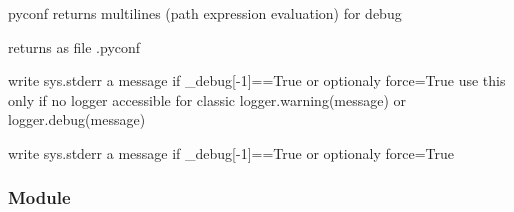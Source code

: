 \documentclass[a4paper,10pt,english]{sphinxmanual}
\begin{document}

\begin{fulllineitems}
\label{\detokenize{commands/apidoc/src:src.debug.saveConfigDbg}}
pyconf returns multilines (path expression evaluation) for debug

\end{fulllineitems}


\begin{fulllineitems}
\label{\detokenize{commands/apidoc/src:src.debug.saveConfigStd}}
returns as file .pyconf

\end{fulllineitems}


\begin{fulllineitems}
\label{\detokenize{commands/apidoc/src:src.debug.tofix}}
write sys.stderr a message if \_debug{[}-1{]}==True or optionaly force=True
use this only if no logger accessible for classic 
logger.warning(message) or logger.debug(message)

\end{fulllineitems}


\begin{fulllineitems}
\label{\detokenize{commands/apidoc/src:src.debug.write}}
write sys.stderr a message if \_debug{[}-1{]}==True or optionaly force=True

\end{fulllineitems}



\subsubsection{ Module}
\label{\detokenize{commands/apidoc/src:environment-module}}\label{\detokenize{commands/apidoc/src:module-src.environment}}
\end{document}
